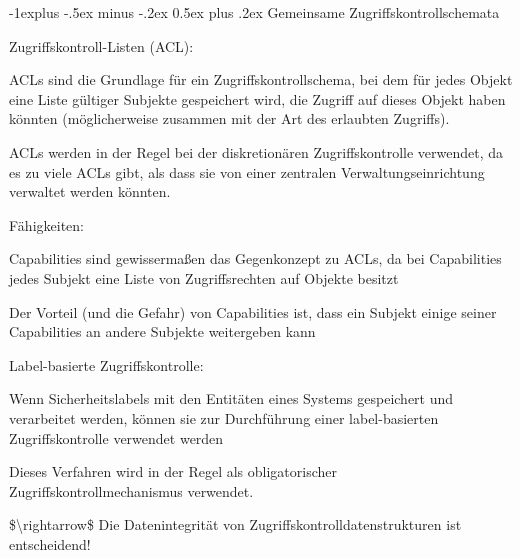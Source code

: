 \documentclass[a4paper]{article}
\makeatletter
\renewcommand{\subsection}{\@startsection{subsection}{2}{0mm}%
 {-1explus -.5ex minus -.2ex}%
 {0.5ex plus .2ex}%
 {\normalfont\normalsize\bfseries}}
\makeatother
\begin{document}
\begin{multicols}{3}


      \subsection{Gemeinsame
            Zugriffskontrollschemata}

      \begin{itemize*}
            \item Zugriffskontroll-Listen (ACL):
            \begin{itemize*}
                  \item ACLs sind die Grundlage für ein Zugriffskontrollschema, bei dem für jedes Objekt eine Liste gültiger Subjekte gespeichert wird, die Zugriff auf dieses Objekt haben könnten (möglicherweise zusammen mit der Art des erlaubten Zugriffs).
                  \item ACLs werden in der Regel bei der diskretionären Zugriffskontrolle verwendet, da es zu viele ACLs gibt, als dass sie von einer zentralen Verwaltungseinrichtung verwaltet werden könnten.
            \end{itemize*}
            \item Fähigkeiten:
            \begin{itemize*}
                  \item Capabilities sind gewissermaßen das Gegenkonzept zu ACLs, da bei Capabilities jedes Subjekt eine Liste von Zugriffsrechten auf Objekte besitzt
                  \item Der Vorteil (und die Gefahr) von Capabilities ist, dass ein Subjekt einige seiner Capabilities an andere Subjekte weitergeben kann
            \end{itemize*}
            \item Label-basierte Zugriffskontrolle:
            \begin{itemize*}
                  \item Wenn Sicherheitslabels mit den Entitäten eines Systems gespeichert und verarbeitet werden, können sie zur Durchführung einer label-basierten Zugriffskontrolle verwendet werden
                  \item Dieses Verfahren wird in der Regel als obligatorischer Zugriffskontrollmechanismus verwendet.
            \end{itemize*}
            \item \$\textbackslash rightarrow\$ Die Datenintegrität von
            Zugriffskontrolldatenstrukturen ist entscheidend!
      \end{itemize*}



\end{multicols}
\end{document}
